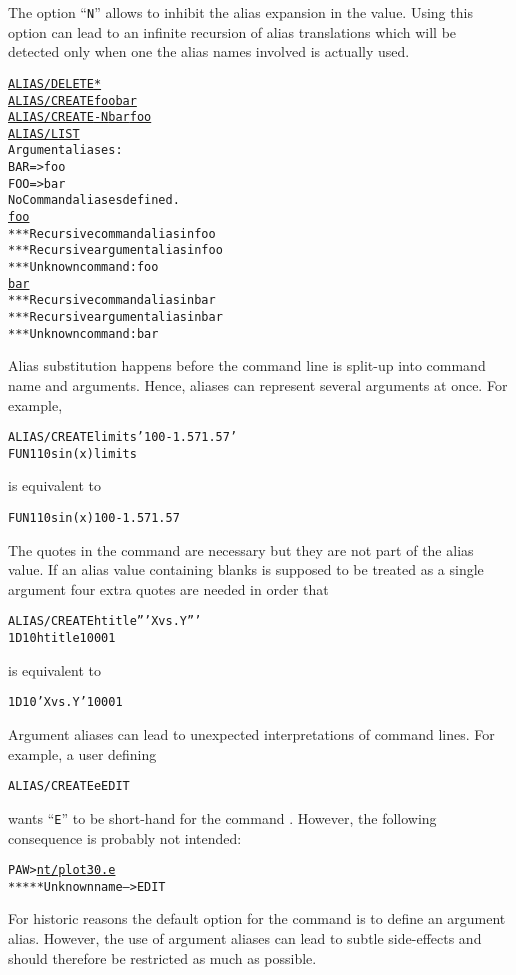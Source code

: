 The option ``\texttt{N}'' allows to inhibit the alias expansion in the
value.
Using this option can lead to an infinite recursion of alias
translations which will be detected only when one the alias
names involved is actually used.
\begin{alltt}
\PROMPT{} \underline{ALIAS/DELETE *}
\PROMPT{} \underline{ALIAS/CREATE foo bar}
\PROMPT{} \underline{ALIAS/CREATE -N bar foo}
\PROMPT{} \underline{ALIAS/LIST}
 Argument aliases:
 BAR        => foo
 FOO        => bar
 No Command aliases defined.
\PROMPT{} \underline{foo}
 *** Recursive command alias in foo
 *** Recursive argument alias in foo
 *** Unknown command: foo
\PROMPT{} \underline{bar}
 *** Recursive command alias in bar
 *** Recursive argument alias in bar
 *** Unknown command: bar
\end{alltt}

Alias substitution happens before the command line is split-up into
command name and arguments.
Hence, aliases can represent several arguments at once.
For example,
\begin{alltt}
ALIAS/CREATE limits '100 -1.57 1.57'
FUN1 10 sin(x) limits
\end{alltt}
is equivalent to
\begin{alltt}
FUN1 10 sin(x) 100 -1.57 1.57
\end{alltt}
The quotes in the  command are necessary but they are
not part of the alias value.
If an alias value containing blanks is supposed to be treated as a
single argument four extra quotes are needed in order that
\begin{alltt}
ALIAS/CREATE htitle '''X vs. Y'''
1D 10 htitle 100 0 1
\end{alltt}
is equivalent to
\begin{alltt}
1D 10 'X vs. Y' 100 0 1
\end{alltt}

Argument aliases can lead to unexpected interpretations of command lines.
For example, a user defining
\begin{alltt}
ALIAS/CREATE e EDIT
\end{alltt}
wants ``\texttt{E}'' to be short-hand for the command .
However, the following consequence is probably not intended:
\begin{alltt} 
PAW > \underline{nt/plot 30.e}
 ***** Unknown name ---> EDIT
\end{alltt}

For historic reasons the default option for the 
command is to define an argument alias.
However, the use of argument aliases can lead to subtle side-effects and
should therefore be restricted as much as possible. 


